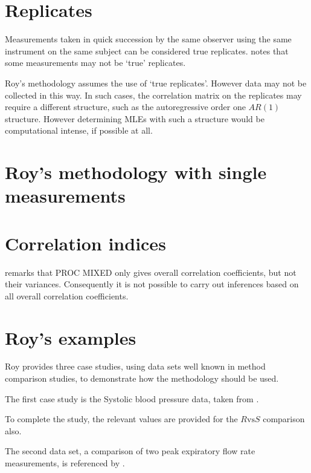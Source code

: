 \documentclass[12pt, a4paper]{article}
\theoremstyle{plain}
\theoremstyle{definition}
\theoremstyle{remark}
\begin{document}
\section{Replicates}
Measurements taken in quick succession by the same observer using the same instrument on the same subject can be considered true replicates. \citet{Roy2009} notes that some measurements may not be `true' replicates.

Roy's methodology assumes the use of `true replicates'. However data may not be collected in this way. In such cases, the correlation matrix on the replicates may require a different structure, such as the autoregressive order one $AR(1)$ structure. However determining MLEs with such a structure would be computational intense, if possible at all.

\section{Roy's methodology with single measurements}

\section{Correlation indices}
\citet{roy} remarks that PROC MIXED only gives overall correlation coefficients, but not their variances. Consequently it is not possible to carry out inferences based on all overall correlation coefficients.


\section{Roy's examples}
Roy provides three case studies, using data sets well known in method comparison studies, to demonstrate how the methodology should be used.



The first case study is the Systolic blood pressure data, taken from \citet{BA99}.



To complete the study, the relevant values are provided for the $R \mbox{vs} S$ comparison also.


The second data set, a comparison of two peak expiratory flow rate measurements, is referenced by \citet{BA86}.
\end{document}
